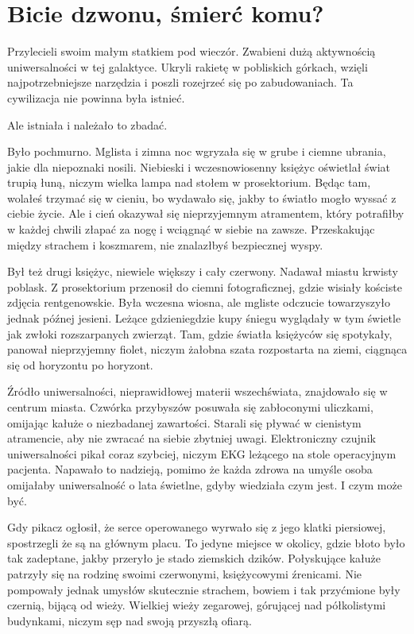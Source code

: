 \chapter{Bicie dzwonu, śmierć komu?}



Przylecieli swoim małym statkiem pod wieczór.
Zwabieni dużą aktywnością uniwersalności w tej galaktyce.
Ukryli rakietę w pobliskich górkach, wzięli najpotrzebniejsze narzędzia i poszli rozejrzeć się po zabudowaniach.
Ta cywilizacja nie powinna była istnieć.

Ale istniała i należało to zbadać.

Było pochmurno.
Mglista i zimna noc wgryzała się w grube i ciemne ubrania, jakie dla niepoznaki nosili.
Niebieski i wczesnowiosenny księżyc oświetlał świat trupią łuną, niczym wielka lampa nad stołem w prosektorium.
Będąc tam, wolałeś trzymać się w cieniu, bo wydawało się, jakby to światło mogło wyssać z ciebie życie.
Ale i cień okazywał się nieprzyjemnym atramentem, który potrafiłby w każdej chwili złapać za nogę i wciągnąć w siebie na zawsze. 
Przeskakując między strachem i koszmarem, nie znalazłbyś bezpiecznej wyspy.

Był też drugi księżyc, niewiele większy i cały czerwony.
Nadawał miastu krwisty poblask. 
Z prosektorium przenosił do ciemni fotograficznej, gdzie wisiały kościste zdjęcia rentgenowskie.
Była wczesna wiosna, ale mgliste odczucie towarzyszyło jednak późnej jesieni.
Leżące gdzieniegdzie kupy śniegu wyglądały w tym świetle jak zwłoki rozszarpanych zwierząt.
Tam, gdzie światła księżyców się spotykały, panował nieprzyjemny fiolet, niczym żałobna szata rozpostarta na ziemi, ciągnąca się od horyzontu po horyzont.

Źródło uniwersalności, nieprawidłowej materii wszechświata, znajdowało się w centrum miasta.
Czwórka przybyszów posuwała się zabłoconymi uliczkami, omijając kałuże o niezbadanej zawartości.
Starali się pływać w cienistym atramencie, aby nie zwracać na siebie zbytniej uwagi.
Elektroniczny czujnik uniwersalności pikał coraz szybciej, niczym EKG leżącego na stole operacyjnym pacjenta.
Napawało to nadzieją, pomimo że każda zdrowa na umyśle osoba omijałaby uniwersalność o lata świetlne, gdyby wiedziała czym jest. I czym może być.

Gdy pikacz ogłosił, że serce operowanego wyrwało się z jego klatki piersiowej, spostrzegli że są na głównym placu. 
To jedyne miejsce w okolicy, gdzie błoto było tak zadeptane, jakby przeryło je stado ziemskich dzików.
Połyskujące kałuże patrzyły się na rodzinę swoimi czerwonymi, księżycowymi źrenicami.
Nie pompowały jednak umysłów skutecznie strachem, bowiem i tak przyćmione były czernią, bijącą od wieży.
Wielkiej wieży zegarowej, górującej nad półkolistymi budynkami, niczym sęp nad swoją przyszłą ofiarą.

